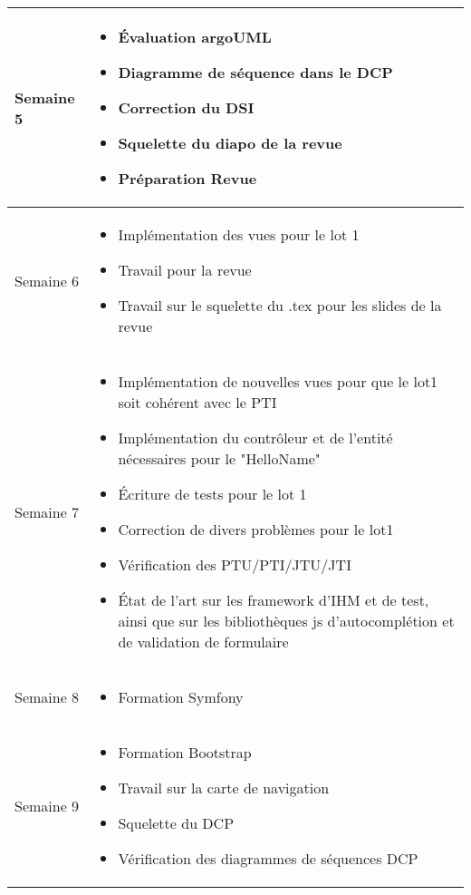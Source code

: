 \documentclass [a4paper] {article}
\begin{document}
\section*{\Matthieu}

\centering
	\begin{longtable}{|>{\columncolor{gray!40}}p{2cm}|p{12cm}|}
	\hline
	Semaine 5 & \begin{itemize}
		\item Évaluation argoUML
		\item Diagramme de séquence dans le DCP
		\item Correction du DSI
		\item Squelette du diapo de la revue
		\item Préparation Revue
	\end{itemize} \\
	\hline
	Semaine 6 & \begin{itemize}
		\item Implémentation des vues pour le lot 1
		\item Travail pour la revue
		\item Travail sur le squelette du .tex pour les slides de la revue
	\end{itemize} \\
	\hline
	Semaine 7 & \begin{itemize}
		\item Implémentation de nouvelles vues pour que le lot1 soit cohérent avec le PTI
		\item Implémentation du contrôleur et de l'entité nécessaires pour le "HelloName"
		\item Écriture de tests pour le lot 1
		\item Correction de divers problèmes pour le lot1
		\item Vérification des PTU/PTI/JTU/JTI
		\item État de l'art sur les framework d'IHM et de test, ainsi que sur les bibliothèques js d'autocomplétion et de validation de formulaire
	\end{itemize} \\
	\hline

	Semaine 8 & \begin{itemize}
		\item Formation Symfony
	\end{itemize} \\
	\hline
	
	Semaine 9 & \begin{itemize}
		\item Formation Bootstrap
		\item Travail sur la carte de navigation
		\item Squelette du DCP
		\item Vérification des diagrammes de séquences DCP
	\end{itemize} \\
	\hline
	

\end{longtable}
\end{document}
